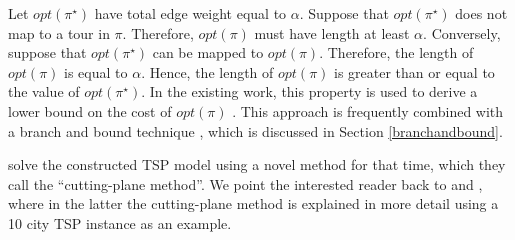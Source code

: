 \documentclass{mprop}
\theoremstyle{definition}
\begin{document}
Let $opt(\pi^{\star})$ have total edge weight equal to $\alpha$. Suppose that $opt(\pi^{\star})$ does not map to a tour in $\pi$. Therefore, $opt(\pi)$ must have length at least $\alpha$. Conversely, suppose that $opt(\pi^{\star})$ can be mapped to $opt(\pi)$. Therefore, the length of $opt(\pi)$ is equal to $\alpha$. Hence, the length of $opt(\pi)$ is greater than or equal to the value of $opt(\pi^{\star})$.
In the existing work, this property is used to derive a lower bound on the cost of $opt(\pi)$ \citep{Little63,Dantzig54,Baker83}. This approach is frequently combined with a branch and bound technique \citep{tspbible}, which is discussed in Section \ref{branchandbound}.




\citet{Dantzig54} solve the constructed TSP model using a novel method for that time, which they call the ``cutting-plane method''. We point the interested reader back to \citep{Dantzig54} and \citep{Dantzig59}, where in the latter the cutting-plane method is explained in more detail using a 10 city TSP instance as an example.

\end{document}
